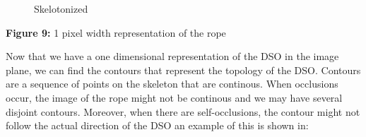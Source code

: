 \begin{figure}
\centering
{}
\caption{Skelotonized}
\end{figure}

\textbf{Figure 9:} 1 pixel width representation of the rope

Now that we have a one dimensional representation of the DSO in the
image plane, we can find the contours that represent the topology of the
DSO. Contours are a sequence of points on the skeleton that are
continous. When occlusions occur, the image of the rope might not be
continous and we may have several disjoint contours. Moreover, when
there are self-occlusions, the contour might not follow the actual
direction of the DSO an example of this is shown in:

